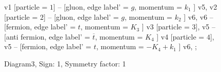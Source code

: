 \documentclass{revtex4}
\begin{document}
\begin{figure}[!htb]
\begin{center}
{    %
v1 [particle = \(1\)] -- [gluon, edge label' = \(g\), momentum = \(k_{1}\) ] v5, 
v2 [particle = \(2\)] -- [gluon, edge label' = \(g\), momentum = \(k_{2}\) ] v6, 
v6 -- [fermion, edge label' = \(t\), momentum = \(K_{3}\) ] v3 [particle = \(3\)], 
v5 -- [anti fermion, edge label' = \(\overline{t}\), momentum = \(K_{4}\) ] v4 [particle = \(4\)], 
v5 -- [fermion, edge label' = \(t\), momentum = \(-K_{4} + k_{1}\) ] v6, 
};
\end{center}
\caption{Diagram3, Sign: 1, Symmetry factor: 1}
\end{figure}
\newpage
\end{document}
